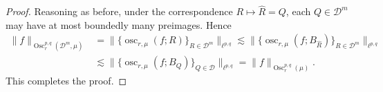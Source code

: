 \documentclass[10pt,a4paper]{amsart}
\newcommand{\BNorm}[2]{\Big\|#1\Big\|_{#2}}
\newcommand{\Norm}[2]{\|#1\|_{#2}}
\begin{document}
\begin{proof}
Reasoning as before, under the correspondence $R\mapsto \hat R=Q$, each $Q\in\mathscr D^m$ may have at most boundedly many preimages. Hence
\begin{equation*}
\begin{split}
  \Norm{f}{\operatorname{Osc}^{p,q}_r(\mathscr D^m,\mu)}
  &=\BNorm{\Big\{\operatorname{osc}_{r,\mu}(f;R)\Big\}_{R\in\mathscr D^m}}{\ell^{p,q}}
  \lesssim \BNorm{\Big\{\operatorname{osc}_{r,\mu}(f;B_{\hat R})\Big\}_{R\in\mathscr D^m}}{\ell^{p,q}} \\
  &\lesssim\BNorm{\Big\{\operatorname{osc}_{r,\mu}(f;B_Q)\Big\}_{Q\in\mathscr D}}{\ell^{p,q}}
  =\Norm{f}{\operatorname{Osc}^{p,q}_r(\mu)}.
\end{split}
\end{equation*}
This completes the proof.
\end{proof}
\end{document}

